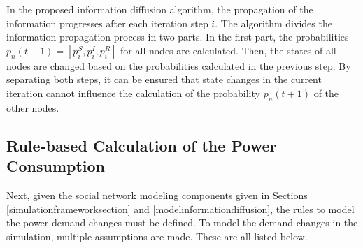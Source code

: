 In the proposed information diffusion algorithm, 
the propagation of the information
progresses after each iteration step $i$. The algorithm divides the 
information propagation process in two parts. In the first part, 
the probabilities $p_n(t+1) = [p_i^S, p_i^I, p_i^R]$ for all nodes are
calculated. Then, the states of all nodes are changed 
based on the probabilities calculated in the previous step.
By separating both steps, it can be ensured that state changes
in the current iteration cannot influence the calculation
of the probability $p_n(t+1)$ of the other nodes.


\subsection{Rule-based Calculation of the Power Consumption}
\label{rulebasedpowerconsumption}

Next, given the social network modeling components given in 
Sections \ref{simulationframeworksection} and 
\ref{modelinformationdiffusion}, the rules to model the
power demand changes must be defined.
To model the demand changes in the simulation, multiple assumptions
are made. These are all listed below.

